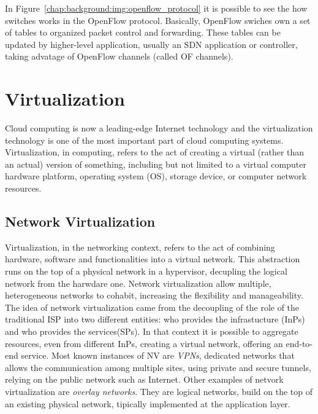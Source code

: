 In Figure~\ref{chap:background:img:openflow_protocol} it is possible to see the
how switches works in the OpenFlow protocol. Basically, OpenFlow swiches own a
set of tables to organized packet control and forwarding. These tables can be
updated by higher-level application, usually an SDN application or controller,
taking advatage of OpenFlow channels (called OF channels). 

\section{Virtualization}
Cloud computing is now a leading-edge Internet technology and the virtualization
technology is one of the most important part of cloud computing systems.
Virtualization, in computing, refers to the act of creating a virtual (rather
than an actual) version of something, including but not limited to a virtual
computer hardware platform, operating system (OS), storage device, or computer
network resources. 

\subsection{Network Virtualization}
Virtualization, in the networking context, refers to the act of combining
hardware, software and functionalities into a virtual network. This abstraction
runs on the top of a physical network in a hypervisor, decupling the logical
network from the harwdare one. Network virtualization allow multiple,
heterogeneous networks to cohabit, increasing the flexibility and manageability.
The idea of network virtualization came from the decoupling of the role of the
traditional ISP into two different entities: who provides the infrastucture
(InPs) and who provides the services(SPs). In that context it is possible to
aggregate resources, even from different InPs, creating a virtual network,
offering an end-to-end service. Most known instances of NV are \emph{VPNs},
dedicated networks that allows the communication among multiple sites, using
private and secure tunnels, relying on the public network such as Internet.
Other examples of netvork virtualization are \emph{overlay networks}. They are
logical networks, build on the top of an existing physical network, tipically
implemented at the application layer. 


